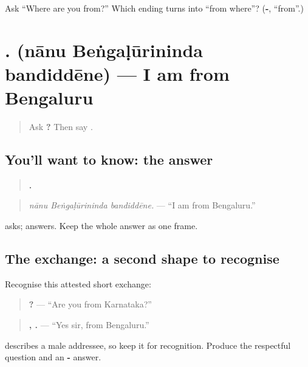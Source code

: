 \begin{tcolorbox}[breakable,colback=teal!4,colframe=teal!35!black,title={Before you move on}]
Ask “Where are you from?” Which ending turns \textbf{} into “from where”? (\textbf{-}, “from”.)
\end{tcolorbox}
\section[\texorpdfstring{\kn{ನಾನು} \kn{ಬೆಂಗಳೂರಿನಿಂದ} … (nānu …)}{ನಾನು ಬೆಂಗಳೂರಿನಿಂದ … (nānu …)}]{  . (nānu Beṅgaḷūrininda bandiddēne) — I am from Bengaluru}

\label{lesson:KA-C103-origin-answer}



\begin{quote}
Ask \textbf{  ?} Then say \textbf{}.
\end{quote}

\subsection*{You'll want to know: the answer}
\begin{quote}
\textbf{  .}
\end{quote}

\begin{quote}
\emph{nānu Beṅgaḷūrininda bandiddēne.} — “I am from Bengaluru.”
\end{quote}

\textbf{} asks; \textbf{} answers. Keep the whole answer as one frame.

\subsection*{The exchange: a second shape to recognise}
Recognise this attested short exchange:

\begin{quote}
\textbf{ ?} — “Are you from Karnataka?”
\end{quote}

\begin{quote}
\textbf{ , .} — “Yes sir, from Bengaluru.”
\end{quote}

\textbf{} describes a male addressee, so keep it for recognition. Produce the respectful \textbf{} question and an \textbf{-} answer.

